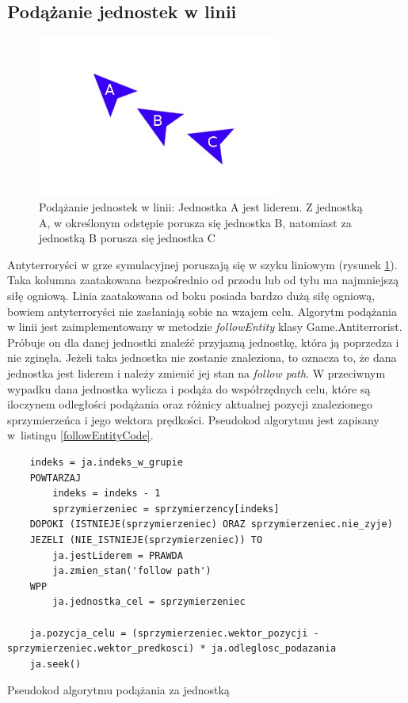 \subsection{Podążanie jednostek w linii}

\begin{figure}
\begin{center}
	\includegraphics[width=80mm,height=53mm]{images/followEntity}
	\caption[Podążanie jednostek w linii]{Podążanie jednostek w linii: Jednostka A jest liderem. Z jednostką A, w określonym odstępie porusza się jednostka B, natomiast za jednostką B porusza się jednostka C\label{followEntityImage}}
\end{center}
\end{figure}

Antyterroryści w grze symulacyjnej poruszają się w szyku liniowym (rysunek \ref{followEntityImage}). Taka kolumna zaatakowana bezpośrednio od przodu lub od tyłu ma najmniejszą siłę ogniową. Linia zaatakowana od boku posiada bardzo dużą siłę ogniową, bowiem antyterroryści nie zasłaniają sobie na wzajem celu. Algorytm podążania w linii jest zaimplementowany w metodzie \emph{followEntity} klasy Game.Antiterrorist. Próbuje on dla danej jednostki znaleźć przyjazną jednostkę, która ją poprzedza i nie zginęła. Jeżeli taka jednostka nie zostanie znaleziona, to oznacza to, że dana jednostka jest liderem i należy zmienić jej stan na \emph{follow path}. W przeciwnym wypadku dana jednostka wylicza i podąża do współrzędnych celu, które są iloczynem odległości podążania oraz różnicy aktualnej pozycji znalezionego sprzymierzeńca i jego wektora prędkości. Pseudokod algorytmu jest zapisany w~listingu \ref{followEntityCode}.

\begin{table}
\begin{center}
\begin{lstlisting}
	indeks = ja.indeks_w_grupie
	POWTARZAJ
		indeks = indeks - 1
		sprzymierzeniec = sprzymierzency[indeks]
	DOPOKI (ISTNIEJE(sprzymierzeniec) ORAZ sprzymierzeniec.nie_zyje)
	JEZELI (NIE_ISTNIEJE(sprzymierzeniec)) TO
		ja.jestLiderem = PRAWDA
		ja.zmien_stan('follow path')
	WPP
		ja.jednostka_cel = sprzymierzeniec

	ja.pozycja_celu = (sprzymierzeniec.wektor_pozycji - sprzymierzeniec.wektor_predkosci) * ja.odleglosc_podazania
	ja.seek()
\end{lstlisting}
\caption {Pseudokod algorytmu podążania za jednostką}
\label{followEntityCode}
\end{center}
\end{table}

